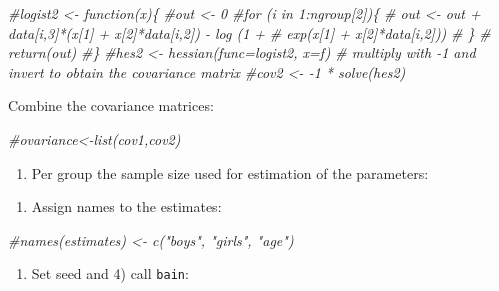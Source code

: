 \documentclass[
]{book}
\newenvironment{Shaded}{\begin{snugshade}}{\end{snugshade}}
\newcommand{\CommentTok}[1]{\textcolor[rgb]{0.56,0.35,0.01}{\textit{#1}}}
\providecommand{\tightlist}{%
  \setlength{\itemsep}{0pt}\setlength{\parskip}{0pt}}
\begin{document}
\begin{Shaded}
\begin{Highlighting}[]
\CommentTok{\#logist2 \textless{}{-} function(x)\{}
  \CommentTok{\#out \textless{}{-} 0}
  \CommentTok{\#for (i in 1:ngroup[2])\{ }
   \CommentTok{\# out \textless{}{-} out + data[i,3]*(x[1] + x[2]*data[i,2]) {-} log (1 +}
   \CommentTok{\# exp(x[1] + x[2]*data[i,2]))}
 \CommentTok{\# \}}
 \CommentTok{\# return(out)}
\CommentTok{\#\}}
\CommentTok{\#hes2 \textless{}{-} hessian(func=logist2, x=f)}
\CommentTok{\# multiply with {-}1 and invert to obtain the covariance matrix}
\CommentTok{\#cov2 \textless{}{-} {-}1 * solve(hes2)}
\end{Highlighting}
\end{Shaded}

Combine the covariance matrices:

\begin{Shaded}
\begin{Highlighting}[]
\CommentTok{\#ovariance\textless{}{-}list(cov1,cov2)}
\end{Highlighting}
\end{Shaded}

\begin{enumerate}
\def\labelenumi{\alph{enumi})}
\setcounter{enumi}{2}
\tightlist
\item
  Per group the sample size used for estimation of the parameters:
\end{enumerate}

\begin{Shaded}
\end{Shaded}

\begin{enumerate}
\def\labelenumi{\arabic{enumi})}
\setcounter{enumi}{1}
\tightlist
\item
  Assign names to the estimates:
\end{enumerate}

\begin{Shaded}
\begin{Highlighting}[]
\CommentTok{\#names(estimates) \textless{}{-} c("boys", "girls", "age")}
\end{Highlighting}
\end{Shaded}

\begin{enumerate}
\def\labelenumi{\arabic{enumi})}
\setcounter{enumi}{2}
\tightlist
\item
  Set seed and 4) call \texttt{bain}:
\end{enumerate}
\end{document}

